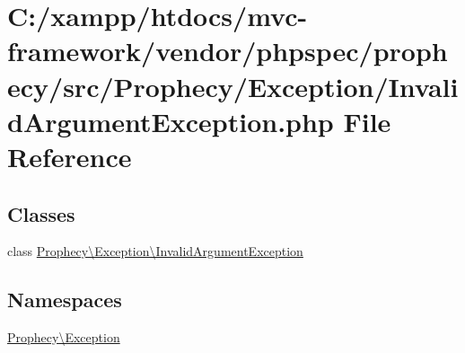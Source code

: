 \hypertarget{phpspec_2prophecy_2src_2_prophecy_2_exception_2_invalid_argument_exception_8php}{}\section{C\+:/xampp/htdocs/mvc-\/framework/vendor/phpspec/prophecy/src/\+Prophecy/\+Exception/\+Invalid\+Argument\+Exception.php File Reference}
\label{phpspec_2prophecy_2src_2_prophecy_2_exception_2_invalid_argument_exception_8php}
\subsection*{Classes}
\begin{DoxyCompactItemize}
\item 
class \hyperlink{class_prophecy_1_1_exception_1_1_invalid_argument_exception}{Prophecy\textbackslash{}\+Exception\textbackslash{}\+Invalid\+Argument\+Exception}
\end{DoxyCompactItemize}
\subsection*{Namespaces}
\begin{DoxyCompactItemize}
\item 
 \hyperlink{namespace_prophecy_1_1_exception}{Prophecy\textbackslash{}\+Exception}
\end{DoxyCompactItemize}
